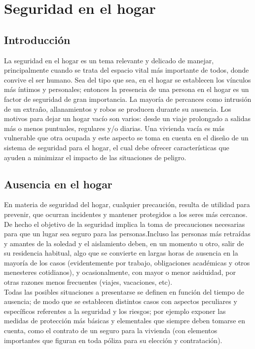 \chapter{Seguridad en el hogar}



\section{Introducción}
La seguridad en el hogar es un tema relevante y delicado de manejar, principalmente cuando se trata del espacio vital más importante de todos, donde convive el ser humano. Sea del tipo que sea, en el hogar se establecen los vínculos más íntimos y personales; entonces la presencia de una persona en el hogar es un factor de seguridad de gran importancia. La mayoría de percances como intrusión de un extraño, allanamientos y robos se producen durante su ausencia. Los motivos para dejar un hogar vacío son varios: desde un viaje prolongado a salidas más o menos puntuales, regulares y/o diarias. Una vivienda vacía es más vulnerable que otra ocupada y este aspecto se toma en cuenta en el diseño de un sistema de seguridad para el hogar, el cual debe ofrecer características que ayuden a minimizar el impacto de las situaciones de peligro.\\

\section{Ausencia en el hogar}
En materia de seguridad del hogar, cualquier precaución, resulta de utilidad para prevenir, que ocurran incidentes y mantener protegidos a los seres más cercanos. De hecho el objetivo de la seguridad implica la toma de precauciones necesarias para que un lugar sea seguro para las personas.Incluso las personas más retraídas y amantes de la soledad y el aislamiento deben, en un momento u otro, salir de su residencia habitual, algo que se convierte en largas horas de ausencia en la mayoría de los casos (evidentemente por trabajo, obligaciones académicas y otros menesteres cotidianos), y ocasionalmente, con mayor o menor asiduidad, por otras razones menos frecuentes (viajes, vacaciones, etc).\\
 
Todas las posibles situaciones a presentarse se definen en función del tiempo de ausencia; de modo que se establecen distintos casos con aspectos peculiares y específicos referentes a la seguridad y los riesgos; por ejemplo exponer las medidas de protección más básicas y elementales que siempre deben tomarse en cuenta, como el contrato de un seguro para la vivienda (con elementos importantes que figuran en toda póliza para su elección y contratación).\\


